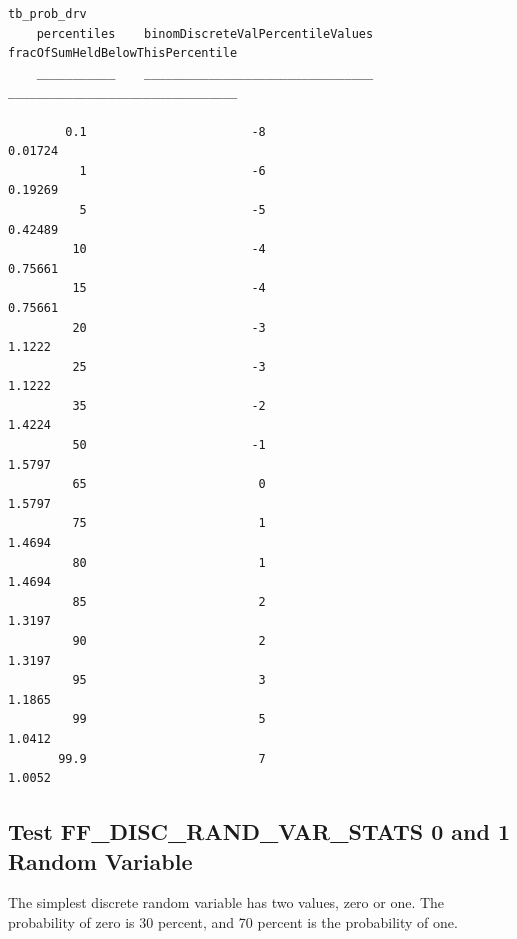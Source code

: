 \documentclass[
]{book}
\begin{document}
\begin{verbatim}
tb_prob_drv
    percentiles    binomDiscreteValPercentileValues    fracOfSumHeldBelowThisPercentile
    ___________    ________________________________    ________________________________

        0.1                       -8                               0.01724             
          1                       -6                               0.19269             
          5                       -5                               0.42489             
         10                       -4                               0.75661             
         15                       -4                               0.75661             
         20                       -3                                1.1222             
         25                       -3                                1.1222             
         35                       -2                                1.4224             
         50                       -1                                1.5797             
         65                        0                                1.5797             
         75                        1                                1.4694             
         80                        1                                1.4694             
         85                        2                                1.3197             
         90                        2                                1.3197             
         95                        3                                1.1865             
         99                        5                                1.0412             
       99.9                        7                                1.0052             
\end{verbatim}

\hypertarget{test-ff_disc_rand_var_stats-0-and-1-random-variable}{%
\subsection{Test FF\_DISC\_RAND\_VAR\_STATS 0 and 1 Random Variable}\label{test-ff_disc_rand_var_stats-0-and-1-random-variable}}

The simplest discrete random variable has two values, zero or one. The
probability of zero is 30 percent, and 70 percent is the probability of
one.
\end{document}
